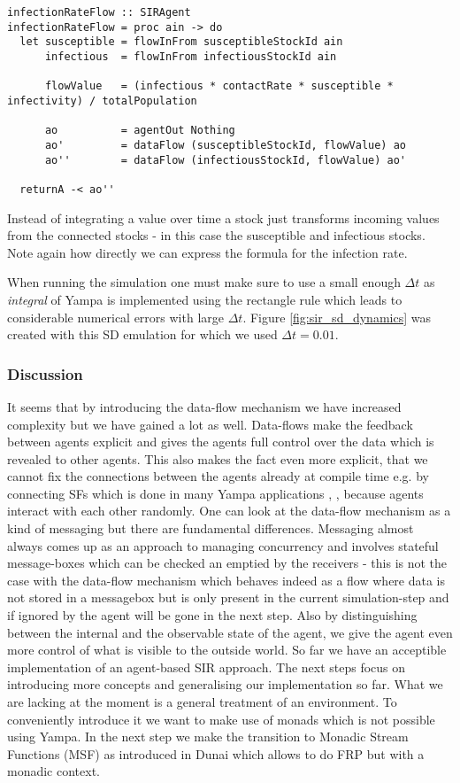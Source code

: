 \begin{verbatim}
infectionRateFlow :: SIRAgent
infectionRateFlow = proc ain -> do
  let susceptible = flowInFrom susceptibleStockId ain 
      infectious  = flowInFrom infectiousStockId ain

      flowValue   = (infectious * contactRate * susceptible * infectivity) / totalPopulation
  
      ao          = agentOut Nothing
      ao'         = dataFlow (susceptibleStockId, flowValue) ao
      ao''        = dataFlow (infectiousStockId, flowValue) ao'
      
  returnA -< ao''
\end{verbatim}

Instead of integrating a value over time a stock just transforms incoming values from the connected stocks - in this case the susceptible and infectious stocks. Note again how directly we can express the formula for the infection rate.

When running the simulation one must make sure to use a small enough $\Delta t$ as \textit{integral} of Yampa is implemented using the rectangle rule which leads to considerable numerical errors with large $\Delta t$. Figure \ref{fig:sir_sd_dynamics} was created with this SD emulation for which we used $\Delta t = 0.01$.

\subsubsection{Discussion}
It seems that by introducing the data-flow mechanism we have increased complexity but we have gained a lot as well. Data-flows make the feedback between agents explicit and gives the agents full control over the data which is revealed to other agents. This also makes the fact even more explicit, that we cannot fix the connections between the agents already at compile time e.g. by connecting SFs which is done in many Yampa applications \cite{nilsson_functional_2002}, \cite{courtney_yampa_2003}, \cite{nilsson_declarative_2014} because agents interact with each other randomly. One can look at the data-flow mechanism as a kind of messaging but there are fundamental differences. Messaging almost always comes up as an approach to managing concurrency and involves stateful message-boxes which can be checked an emptied by the receivers - this is not the case with the data-flow mechanism which behaves indeed as a flow where data is not stored in a messagebox but is only present in the current simulation-step and if ignored by the agent will be gone in the next step.
Also by distinguishing between the internal and the observable state of the agent, we give the agent even more control of what is visible to the outside world.
So far we have an acceptible implementation of an agent-based SIR approach. The next steps focus on introducing more concepts and generalising our implementation so far. What we are lacking at the moment is a general treatment of an environment. To conveniently introduce it we want to make use of monads which is not possible using Yampa. In the next step we make the transition to Monadic Stream Functions (MSF) as introduced in Dunai \cite{perez_functional_2016} which allows to do FRP but with a monadic context.